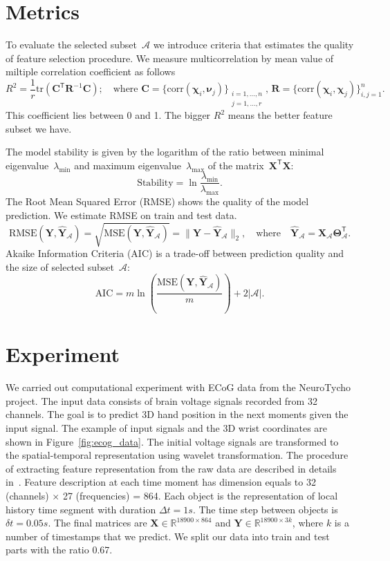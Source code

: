\documentclass[12pt,twoside]{article}
\theoremstyle{definition}
\newcommand{\bY}{\mathbf{Y}}
\newcommand{\bX}{\mathbf{X}}
\newcommand{\bC}{\mathbf{C}}
\newcommand{\bbR}{\mathbb{R}}
\newcommand{\cA}{\mathcal{A}}
\newcommand{\T}{\mathsf{T}}
\newcommand{\bchi}{\boldsymbol{\chi}}
\newcommand{\bnu}{\boldsymbol{\nu}}
\newcommand{\bTheta}{\boldsymbol{\Theta}}
\begin{document}
\section{Metrics}

To evaluate the selected subset~$\cA$ we introduce criteria that estimates the quality of feature selection procedure.
We measure multicorrelation by mean value of miltiple correlation coefficient as follows
\[
	R^2 = \frac{1}{r} \text{tr} \left( \bC^{\T} \mathbf{R}^{-1} \bC \right); \quad \text{where }\bC = \{ \text{corr}(\bchi_i, \bnu_j)\}_{\substack{i=1, \dots, n \\ j=1, \dots, r}}, \, \mathbf{R} = \{ \text{corr}(\bchi_i, \bchi_j)\}_{i, j = 1}^n.
\]
This coefficient lies between 0 and 1. The bigger $R^2$ means the better feature subset we have.

The model stability is given by the logarithm of the ratio between minimal eigenvalue~$\lambda_{\min}$ and maximum eigenvalue~$\lambda_{\max}$ of the matrix~$\bX^{\T} \bX$:
\[
	\text{Stability} = \ln \frac{\lambda_{\min}}{\lambda_{\max}}.
\]
The Root Mean Squared Error (RMSE) shows the quality of the model prediction. We estimate RMSE on train and test data.
\[
	\text{RMSE}(\bY, \widehat{\bY}_{\cA}) = \sqrt{\text{MSE} (\bY, \widehat{\bY}_{\cA})} =  \| \bY - \widehat{\bY}_{\cA} \|_2, \quad \text{where} \quad \widehat{\bY}_{\cA} = \bX_{\cA} \bTheta_{\cA}^{\T}.
\]
Akaike Information Criteria (AIC) is a trade-off between prediction quality and the size of selected subset~$\cA$:
\[
	\text{AIC} = m \ln \left( \frac{\text{MSE} ( \bY, \widehat{\bY}_{\cA})}{m}\right) + 2 | \cA |.
\]

\section{Experiment}
We carried out computational experiment with ECoG data from the NeuroTycho project. The input data consists of brain voltage signals recorded from 32 channels.
The goal is to predict 3D hand position in the next moments given the input signal.
The example of input signals and the 3D wrist coordinates are shown in Figure~\ref{fig:ecog_data}.
The initial voltage signals are transformed to the spatial-temporal representation using wavelet transformation.
The procedure of extracting feature representation from the raw data are described in details in~\cite{chao2010long,eliseyev2016penalized}.
Feature description at each time moment has dimension equals to 32 (channels) $\times$ 27 (frequencies) = 864.
Each object is the representation of local history time segment with duration $\Delta t = 1s$. The time step between objects is $\delta t =  0.05s$.
The final matrices are $\bX \in \bbR^{18900 \times 864}$ and $\bY \in \bbR^{18900 \times 3k}$, where $k$ is a number of timestamps that we predict.
We split our data into train and test parts with the ratio 0.67.
\end{document}
